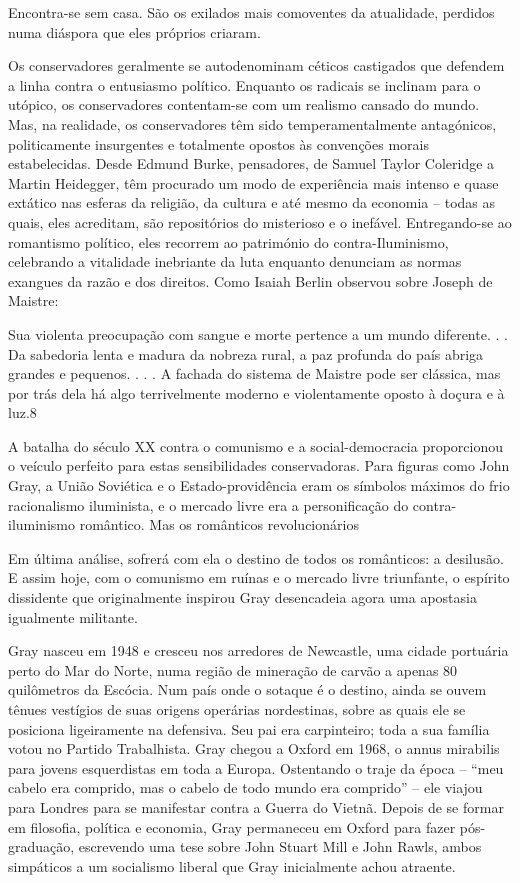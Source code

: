  \par 
Encontra-se sem casa. São os exilados mais comoventes da atualidade, perdidos numa diáspora que eles próprios criaram.
 \par 
Os conservadores geralmente se autodenominam céticos castigados que defendem a linha contra o entusiasmo político. Enquanto os radicais se inclinam para o utópico, os conservadores contentam-se com um realismo cansado do mundo. Mas, na realidade, os conservadores têm sido temperamentalmente antagónicos, politicamente insurgentes e totalmente opostos às convenções morais estabelecidas. Desde Edmund Burke, pensadores, de Samuel Taylor Coleridge a Martin Heidegger, têm procurado um modo de experiência mais intenso e quase extático nas esferas da religião, da cultura e até mesmo da economia – todas as quais, eles acreditam, são repositórios do misterioso e o inefável. Entregando-se ao romantismo político, eles recorrem ao património do contra-Iluminismo, celebrando a vitalidade inebriante da luta enquanto denunciam as normas exangues da razão e dos direitos. Como Isaiah Berlin observou sobre Joseph de Maistre:
 \par 
Sua violenta preocupação com sangue e morte pertence a um mundo diferente. . . Da sabedoria lenta e madura da nobreza rural, a paz profunda do país abriga grandes e pequenos. . . . A fachada do sistema de Maistre pode ser clássica, mas por trás dela há algo terrivelmente moderno e violentamente oposto à doçura e à luz.{\color{blue}8}
 \par 
A batalha do século XX contra o comunismo e a social-democracia proporcionou o veículo perfeito para estas sensibilidades conservadoras. Para figuras como John Gray, a União Soviética e o Estado-providência eram os símbolos máximos do frio racionalismo iluminista, e o mercado livre era a personificação do contra-iluminismo romântico. Mas os românticos revolucionários
 \par 
Em última análise, sofrerá com ela o destino de todos os românticos: a desilusão. E assim hoje, com o comunismo em ruínas e o mercado livre triunfante, o espírito dissidente que originalmente inspirou Gray desencadeia agora uma apostasia igualmente militante.
 \par 
Gray nasceu em 1948 e cresceu nos arredores de Newcastle, uma cidade portuária perto do Mar do Norte, numa região de mineração de carvão a apenas {\color{blue}80} quilômetros da Escócia. Num país onde o sotaque é o destino, ainda se ouvem tênues vestígios de suas origens operárias nordestinas, sobre as quais ele se posiciona ligeiramente na defensiva. Seu pai era carpinteiro; toda a sua família votou no Partido Trabalhista. Gray chegou a Oxford em 1968, o annus mirabilis para jovens esquerdistas em toda a Europa. Ostentando o traje da época – “meu cabelo era comprido, mas o cabelo de todo mundo era comprido” – ele viajou para Londres para se manifestar contra a Guerra do Vietnã. Depois de se formar em filosofia, política e economia, Gray permaneceu em Oxford para fazer pós-graduação, escrevendo uma tese sobre John Stuart Mill e John Rawls, ambos simpáticos a um socialismo liberal que Gray inicialmente achou atraente.
